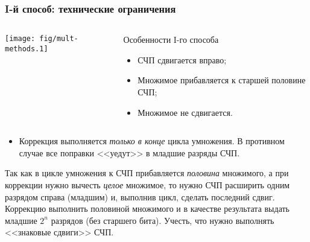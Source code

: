 \begin{frame}
    \frametitle{I-й способ: технические ограничения}
    
    \begin{columns}
            \begin{block}{}
                \texttt{[image: fig/mult-methods.1]}            
            \end{block}
            \begin{block}{Особенности I-го способа}
                \begin{itemize}
                    \item СЧП сдвигается вправо; 
                    \item Множимое прибавляется к старшей половине СЧП;
                    \item Множимое не сдвигается.
                \end{itemize}
            \end{block}
    \end{columns}
    
    \begin{itemize}
        \item Коррекция выполняется \emph{только в конце} цикла умножения. В противном случае все поправки <<уедут>> в младшие разряды СЧП.
    \end{itemize}
    Так как в цикле умножения к СЧП прибавляется \emph{половина} множимого, а при коррекции нужно вычесть \emph{целое} множимое, то нужно СЧП расширить одним разрядом справа (младшим) и, выполнив цикл, сделать последний сдвиг. Коррекцию выполнить половиной множимого и в качестве результата выдать младшие $2^n$ разрядов (без старшего бита). Учесть, что нужно выполнять <<знаковые сдвиги>> СЧП.
\end{frame}    


